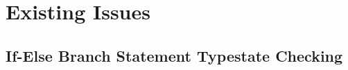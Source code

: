 \documentclass[]{article}
\begin{document}
\section{Existing Issues}
\subsection{If-Else Branch Statement Typestate Checking}


%
\end{document}
